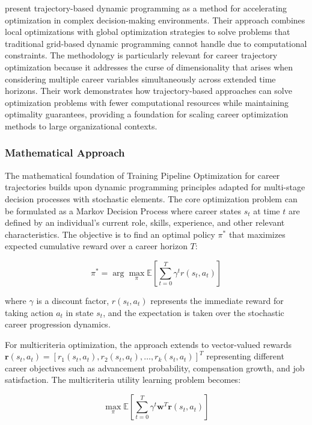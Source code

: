 \documentclass[main.tex]{subfiles}
\begin{document}
\textcite{trajectory_dp} present trajectory-based dynamic programming as a method for accelerating optimization in complex decision-making environments. Their approach combines local optimizations with global optimization strategies to solve problems that traditional grid-based dynamic programming cannot handle due to computational constraints. The methodology is particularly relevant for career trajectory optimization because it addresses the curse of dimensionality that arises when considering multiple career variables simultaneously across extended time horizons. Their work demonstrates how trajectory-based approaches can solve optimization problems with fewer computational resources while maintaining optimality guarantees, providing a foundation for scaling career optimization methods to large organizational contexts.

\subsubsection{Mathematical Approach}

The mathematical foundation of Training Pipeline Optimization for career trajectories builds upon dynamic programming principles adapted for multi-stage decision processes with stochastic elements\parencite{trajectory_dp,dynamic_programming}. The core optimization problem can be formulated as a Markov Decision Process where career states \( s_t \) at time \( t \) are defined by an individual's current role, skills, experience, and other relevant characteristics\parencite{jobcomposer}. The objective is to find an optimal policy \( \pi^* \) that maximizes expected cumulative reward over a career horizon \( T \):

\[
\pi^* = \arg\max_\pi \mathbb{E}\left[\sum_{t=0}^T \gamma^t r(s_t, a_t)\right]
\]

where \( \gamma \) is a discount factor, \( r(s_t, a_t) \) represents the immediate reward for taking action \( a_t \) in state \( s_t \), and the expectation is taken over the stochastic career progression dynamics\parencite{dynamic_programming}.

For multicriteria optimization, the approach extends to vector-valued rewards \( \mathbf{r}(s_t, a_t) = [r_1(s_t, a_t), r_2(s_t, a_t), \ldots, r_k(s_t, a_t)]^T \) representing different career objectives such as advancement probability, compensation growth, and job satisfaction\parencite{jobcomposer}. The multicriteria utility learning problem becomes:

\[
\max_\pi \mathbb{E}\left[\sum_{t=0}^T \gamma^t \mathbf{w}^T \mathbf{r}(s_t, a_t)\right]
\]
\end{document}
